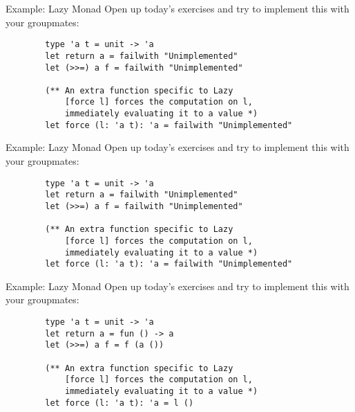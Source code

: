 \documentclass{beamer}
\begin{document}
    
    
    \begin{frame}[fragile]{Example: Lazy Monad}
        Open up today's exercises and try to implement this with your groupmates:
        
        \begin{verbatim}
        type 'a t = unit -> 'a
        let return a = failwith "Unimplemented"
        let (>>=) a f = failwith "Unimplemented"
    
        (** An extra function specific to Lazy
            [force l] forces the computation on l,
            immediately evaluating it to a value *)
        let force (l: 'a t): 'a = failwith "Unimplemented" 
        \end{verbatim}
    \end{frame}
    
    \begin{frame}[fragile]{Example: Lazy Monad}
        Open up today's exercises and try to implement this with your groupmates:
        
        \begin{verbatim}
        type 'a t = unit -> 'a
        let return a = failwith "Unimplemented"
        let (>>=) a f = failwith "Unimplemented"
    
        (** An extra function specific to Lazy
            [force l] forces the computation on l,
            immediately evaluating it to a value *)
        let force (l: 'a t): 'a = failwith "Unimplemented" 
        \end{verbatim}
    \end{frame}
    
    
    \begin{frame}[fragile]{Example: Lazy Monad}
        Open up today's exercises and try to implement this with your groupmates:
        
        \begin{verbatim}
        type 'a t = unit -> 'a
        let return a = fun () -> a
        let (>>=) a f = f (a ())
    
        (** An extra function specific to Lazy
            [force l] forces the computation on l,
            immediately evaluating it to a value *)
        let force (l: 'a t): 'a = l ()
        \end{verbatim}
    \end{frame}
    
    
    
\end{document}
